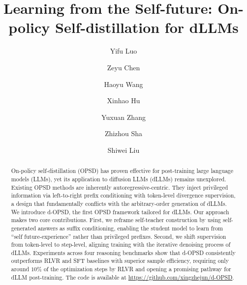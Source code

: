 \documentclass{llmxive}
\title{Learning from the Self-future: On-policy Self-distillation for dLLMs}
\author{Yifu Luo \and Zeyu Chen \and Haoyu Wang \and Xinhao Hu \and Yuxuan Zhang \and Zhizhou Sha \and Shiwei Liu}
\providecommand{\question}[2]{\begin{tcolorbox}[
    enhanced,
    colback=white,
    colframe=white,
    leftrule=0.4mm,
    rightrule=0.4mm,
    toprule=0.4mm,
    bottomrule=0.4mm,
    arc=0mm,
    left=0pt,
    right=0pt,
    top=2pt,
    bottom=2pt,
    breakable,
    borderline north={0.4mm}{0pt}{myblue},
    borderline south={0.4mm}{0pt}{myblue}
]
{\textbf{Question:}} #1 \\
{\textbf{Answer:}} #2
\end{tcolorbox}
}
\providecommand{\twoquestion}[4]{\begin{tcolorbox}[
    enhanced,
    colback=white,
    colframe=white,
    leftrule=0.4mm,
    rightrule=0.4mm,
    toprule=0.4mm,
    bottomrule=0.4mm,
    arc=0mm,
    left=0pt,
    right=0pt,
    top=2pt,
    bottom=2pt,
    breakable,
    borderline north={0.4mm}{0pt}{myblue},
    borderline south={0.4mm}{0pt}{myblue}
]
{\textbf{Question:}} #1 \\
{\textbf{Answer:}} #2 \\
\\
{\textbf{Question:}} #3 \\
{\textbf{Answer:}} #4
\end{tcolorbox}
}
\begin{document}
\maketitle
\begin{abstract}
On-policy self-distillation (OPSD) has proven effective for post-training large language models (LLMs), yet its application to diffusion LLMs (dLLMs) remains unexplored. Existing OPSD methods are inherently autoregressive-centric. They inject privileged information via left-to-right prefix conditioning with token-level divergence supervision, a design that fundamentally conflicts with the arbitrary-order generation of dLLMs. We introduce d-OPSD, the first OPSD framework tailored for dLLMs. Our approach makes two core contributions. First, we reframe self-teacher construction by using self-generated answers as suffix conditioning, enabling the student model to learn from ``self future-experience'' rather than privileged prefixes. Second, we shift supervision from token-level to step-level, aligning training with the iterative denoising process of dLLMs. Experiments across four reasoning benchmarks show that d-OPSD consistently outperforms RLVR and SFT baselines with superior sample efficiency, requiring only around $10\%$ of the optimization steps by RLVR and opening a promising pathway for dLLM post-training. The code is available at \url{https://github.com/xingzhejun/d-OPSD}.
\end{abstract}
\renewcommand{\question}[2]{%
\begin{tcolorbox}[
    enhanced,
    colback=white,
    colframe=white,
    leftrule=0.4mm,
    rightrule=0.4mm,
    toprule=0.4mm,
    bottomrule=0.4mm,
    arc=0mm,
    left=0pt,
    right=0pt,
    top=2pt,
    bottom=2pt,
    breakable,
    borderline north={0.4mm}{0pt}{myblue},
    borderline south={0.4mm}{0pt}{myblue}
]
{\textbf{Question:}} #1 \\
{\textbf{Answer:}} #2
\end{tcolorbox}
}

\renewcommand{\twoquestion}[4]{%
\begin{tcolorbox}[
    enhanced,
    colback=white,
    colframe=white,
    leftrule=0.4mm,
    rightrule=0.4mm,
    toprule=0.4mm,
    bottomrule=0.4mm,
    arc=0mm,
    left=0pt,
    right=0pt,
    top=2pt,
    bottom=2pt,
    breakable,
    borderline north={0.4mm}{0pt}{myblue},
    borderline south={0.4mm}{0pt}{myblue}
]
{\textbf{Question:}} #1 \\
{\textbf{Answer:}} #2 \\
\\
{\textbf{Question:}} #3 \\
{\textbf{Answer:}} #4
\end{tcolorbox}
}
\end{document}
